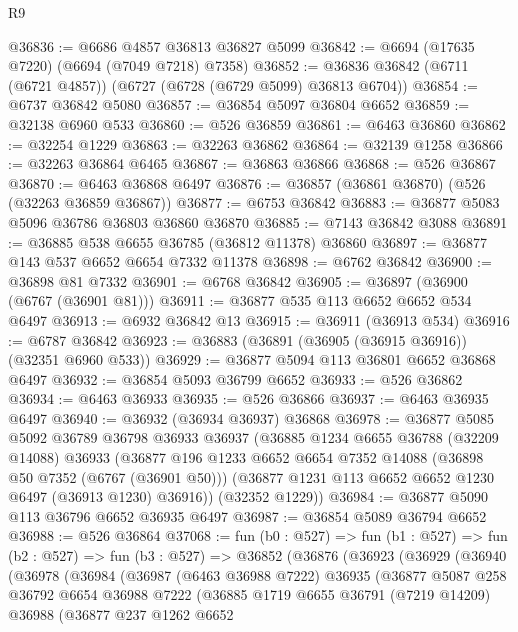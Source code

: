 \begin{lexlean}{R9}
\begin{coremodule}
@36836 := @6686 @4857 @36813 @36827 @5099
@36842 := @6694 (@17635 @7220) (@6694 (@7049 @7218) @7358)
@36852 := @36836 @36842 (@6711 (@6721 @4857)) (@6727 (@6728 (@6729 @5099) @36813 @6704))
@36854 := @6737 @36842 @5080
@36857 := @36854 @5097 @36804 @6652
@36859 := @32138 @6960 @533
@36860 := @526 @36859
@36861 := @6463 @36860
@36862 := @32254 @1229
@36863 := @32263 @36862
@36864 := @32139 @1258
@36866 := @32263 @36864 @6465
@36867 := @36863 @36866
@36868 := @526 @36867
@36870 := @6463 @36868 @6497
@36876 := @36857 (@36861 @36870) (@526 (@32263 @36859 @36867))
@36877 := @6753 @36842
@36883 := @36877 @5083 @5096 @36786 @36803 @36860 @36870
@36885 := @7143 @36842 @3088
@36891 := @36885 @538 @6655 @36785 (@36812 @11378) @36860
@36897 := @36877 @143 @537 @6652 @6654 @7332 @11378
@36898 := @6762 @36842
@36900 := @36898 @81 @7332
@36901 := @6768 @36842
@36905 := @36897 (@36900 (@6767 (@36901 @81)))
@36911 := @36877 @535 @113 @6652 @6652 @534 @6497
@36913 := @6932 @36842 @13
@36915 := @36911 (@36913 @534)
@36916 := @6787 @36842
@36923 := @36883 (@36891 (@36905 (@36915 @36916)) (@32351 @6960 @533))
@36929 := @36877 @5094 @113 @36801 @6652 @36868 @6497
@36932 := @36854 @5093 @36799 @6652
@36933 := @526 @36862
@36934 := @6463 @36933
@36935 := @526 @36866
@36937 := @6463 @36935 @6497
@36940 := @36932 (@36934 @36937) @36868
@36978 := @36877
    @5085
    @5092
    @36789
    @36798
    @36933
    @36937
    (@36885
      @1234
      @6655
      @36788
      (@32209 @14088)
      @36933
      (@36877
        @196
        @1233
        @6652
        @6654
        @7352
        @14088
        (@36898 @50 @7352 (@6767 (@36901 @50)))
        (@36877 @1231 @113 @6652 @6652 @1230 @6497 (@36913 @1230) @36916))
      (@32352 @1229))
@36984 := @36877 @5090 @113 @36796 @6652 @36935 @6497
@36987 := @36854 @5089 @36794 @6652
@36988 := @526 @36864
@37068 := fun (b0 : @527) =>
  fun (b1 : @527) =>
  fun (b2 : @527) =>
  fun (b3 : @527) =>
  @36852
    (@36876
      (@36923
        (@36929
          (@36940
            (@36978
              (@36984
                (@36987
                  (@6463 @36988 @7222)
                  @36935
                  (@36877
                    @5087
                    @258
                    @36792
                    @6654
                    @36988
                    @7222
                    (@36885
                      @1719
                      @6655
                      @36791
                      (@7219 @14209)
                      @36988
                      (@36877
                        @237
                        @1262
                        @6652

\end{coremodule}
\end{lexlean}
